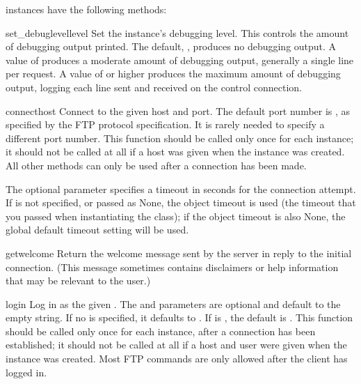  instances have the following methods:

\begin{methoddesc}[FTP]{set_debuglevel}{level}
Set the instance's debugging level.  This controls the amount of
debugging output printed.  The default, , produces no
debugging output.  A value of  produces a moderate amount of
debugging output, generally a single line per request.  A value of
 or higher produces the maximum amount of debugging output,
logging each line sent and received on the control connection.
\end{methoddesc}

\begin{methoddesc}[FTP]{connect}{host}
Connect to the given host and port.  The default port number is , as
specified by the FTP protocol specification.  It is rarely needed to
specify a different port number.  This function should be called only
once for each instance; it should not be called at all if a host was
given when the instance was created.  All other methods can only be
used after a connection has been made.

The optional  parameter specifies a timeout in seconds for
the connection attempt. If is not specified, or passed as None, the 
object timeout is used (the timeout that you passed when instantiating the
class); if the object timeout is also None, the global default timeout 
setting will be used.

\end{methoddesc}

\begin{methoddesc}[FTP]{getwelcome}{}
Return the welcome message sent by the server in reply to the initial
connection.  (This message sometimes contains disclaimers or help
information that may be relevant to the user.)
\end{methoddesc}

\begin{methoddesc}[FTP]{login}{}
Log in as the given .  The  and 
parameters are optional and default to the empty string.  If no
 is specified, it defaults to .  If
 is , the default  is
.  This function should be called only
once for each instance, after a connection has been established; it
should not be called at all if a host and user were given when the
instance was created.  Most FTP commands are only allowed after the
client has logged in.
\end{methoddesc}

